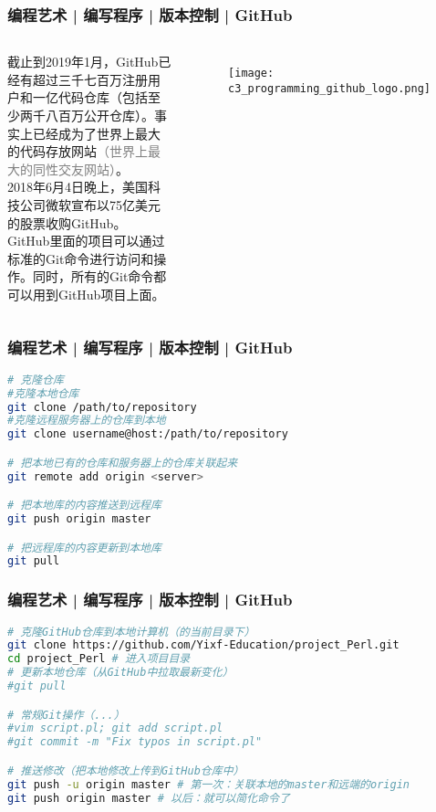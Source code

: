 \begin{frame}
  \frametitle{编程艺术 | 编写程序 | 版本控制 | \alert{GitHub}}
  \begin{columns}
    截止到2019年1月，GitHub已经有超过三千七百万注册用户和一亿代码仓库（包括至少两千八百万公开仓库）。事实上已经成为了\alert{世界上最大的代码存放网站}\textcolor{gray}{（世界上最大的同性交友网站）}。\\
  \vspace{1em}
  2018年6月4日晚上，美国科技公司微软宣布以75亿美元的股票收购GitHub。\\
  \vspace{1em}
  GitHub里面的项目可以通过标准的Git命令进行访问和操作。同时，所有的Git命令都可以用到GitHub项目上面。
    \begin{figure}
      \centering
      \texttt{[image: c3\_programming\_github\_logo.png]}
    \end{figure}
\end{columns}
\end{frame}

\begin{frame}[fragile]
  \frametitle{编程艺术 | 编写程序 | 版本控制 | \alert{GitHub}}
  \vspace{-1.5em}
\begin{lstlisting}[language=sh]
# 克隆仓库
#克隆本地仓库
git clone /path/to/repository
#克隆远程服务器上的仓库到本地
git clone username@host:/path/to/repository

# 把本地已有的仓库和服务器上的仓库关联起来
git remote add origin <server>

# 把本地库的内容推送到远程库
git push origin master

# 把远程库的内容更新到本地库
git pull
\end{lstlisting}
\end{frame}

\begin{frame}[fragile]
  \frametitle{编程艺术 | 编写程序 | 版本控制 | GitHub}
  \vspace{-1.5em}
\begin{lstlisting}[language=sh]
# 克隆GitHub仓库到本地计算机（的当前目录下）
git clone https://github.com/Yixf-Education/project_Perl.git
cd project_Perl # 进入项目目录
# 更新本地仓库（从GitHub中拉取最新变化）
#git pull

# 常规Git操作（...）
#vim script.pl; git add script.pl
#git commit -m "Fix typos in script.pl" 

# 推送修改（把本地修改上传到GitHub仓库中）
git push -u origin master # 第一次：关联本地的master和远端的origin
git push origin master # 以后：就可以简化命令了
\end{lstlisting}
\end{frame}

